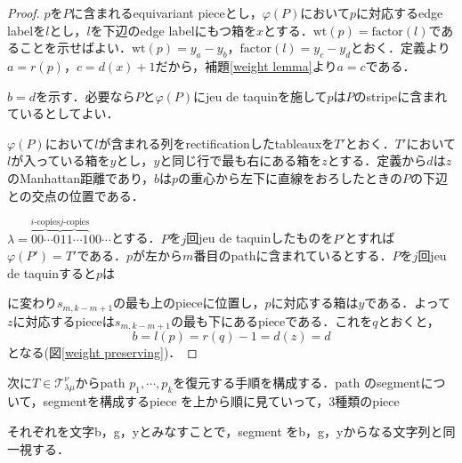 \begin{proof}
  $p$を$P$に含まれるequivariant pieceとし，$\varphi(P)$において$p$に対応するedge labelを$l$とし，$l$を下辺のedge labelにもつ箱を$x$とする．$\text{wt}(p)=\text{factor}(l)$であることを示せばよい．$\text{wt}(p) = y_a-y_b$，$\text{factor}(l)=y_c-y_d$とおく．定義より$a=r(p)$，$c=d(x)+1$だから，補題\ref{weight lemma}より$a=c$である．

  $b=d$を示す．必要なら$P$と$\varphi(P)$にjeu de taquinを施して$p$は$P$のstripeに含まれているとしてよい．
  
  $\varphi(P)$において$l$が含まれる列をrectificationしたtableauxを$T'$とおく．$T'$において$l$が入っている箱を$y$とし，$y$と同じ行で最も右にある箱を$z$とする．定義から$d$は$z$のManhattan距離であり，$b$は$p$の重心から左下に直線をおろしたときの$P$の下辺との交点の位置である．
  
  $\lambda = \overbrace{00\cdots0}^{i\text{-copies}}\overbrace{11\cdots1}^{j\text{-copies}}00\cdots$とする．$P$を$j$回jeu de taquinしたものを$P'$とすれば$\varphi(P')=T'$である．$p$が左から$m$番目のpathに含まれているとする．$P$を$j$回jeu de taquinすると$p$は
  に変わり$s_{m,k-m+1}$の最も上のpieceに位置し，$p$に対応する箱は$y$である．よって$z$に対応するpieceは$s_{m,k-m+1}$の最も下にあるpieceである．これを$q$とおくと，\[
  b = l(p) = r(q) - 1 = d(z) = d
  \]
  となる(図\ref{weight preserving})．

  
\end{proof}

次に$T\in\mathcal{T}^\nu_{\lambda\mu}$からpath $p_1,\cdots,p_k$を復元する手順を構成する．path のsegmentについて，segmentを構成するpiece を上から順に見ていって，$3$種類のpiece 
それぞれを文字b，g，yとみなすことで，segment をb，g，yからなる文字列と同一視する．

